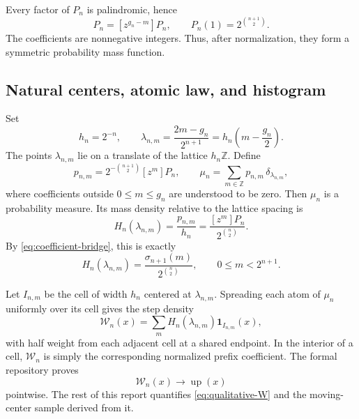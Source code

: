 \documentclass[11pt,oneside]{article}
\theoremstyle{definition}
\theoremstyle{remark}
\newcommand{\Z}{\mathbb Z}
\newcommand{\Up}{\operatorname{up}}
\begin{document}
Every factor of $P_n$ is palindromic, hence
\begin{equation}
 [z^m]P_n=[z^{g_n-m}]P_n,
 \qquad
 P_n(1)=2^{\binom{n+1}{2}}.                               \label{eq:Pn-symmetry-mass}
\end{equation}
The coefficients are nonnegative integers.  Thus, after normalization, they form a symmetric
probability mass function.

\subsection{Natural centers, atomic law, and histogram}

Set
\begin{equation}
 h_n=2^{-n},
 \qquad
 \lambda_{n,m}=\frac{2m-g_n}{2^{n+1}}
 =h_n\left(m-\frac{g_n}{2}\right).                        \label{eq:center}
\end{equation}
The points $\lambda_{n,m}$ lie on a translate of the lattice $h_n\Z$.  Define
\begin{equation}
 p_{n,m}=2^{-\binom{n+1}{2}}[z^m]P_n,
 \qquad
 \mu_n=\sum_{m\in\Z}p_{n,m}\,\delta_{\lambda_{n,m}},    \label{eq:atomic-law}
\end{equation}
where coefficients outside $0\le m\le g_n$ are understood to be zero.  Then $\mu_n$ is a
probability measure.  Its mass density relative to the lattice spacing is
\begin{equation}
 H_n(\lambda_{n,m})=\frac{p_{n,m}}{h_n}
 =\frac{[z^m]P_n}{2^{\binom n2}}.                          \label{eq:Hn}
\end{equation}
By \eqref{eq:coefficient-bridge}, this is exactly
\begin{equation}
 H_n(\lambda_{n,m})
 =\frac{\sigma_{n+1}(m)}{2^{\binom n2}},
 \qquad 0\le m<2^{n+1}.                                  \label{eq:Hn-prefix}
\end{equation}

Let $I_{n,m}$ be the cell of width $h_n$ centered at $\lambda_{n,m}$.  Spreading each atom of
$\mu_n$ uniformly over its cell gives the step density
\begin{equation}
 \mathcal W_n(x)=\sum_m H_n(\lambda_{n,m})\mathbf 1_{I_{n,m}}(x), \label{eq:Wn}
\end{equation}
with half weight from each adjacent cell at a shared endpoint.  In the interior of a cell,
$\mathcal W_n$ is simply the corresponding normalized prefix coefficient.  The formal
repository proves
\begin{equation}
 \mathcal W_n(x)\longrightarrow\Up(x)                     \label{eq:qualitative-W}
\end{equation}
pointwise.  The rest of this report quantifies \eqref{eq:qualitative-W} and the moving-center
sample derived from it.
\end{document}
